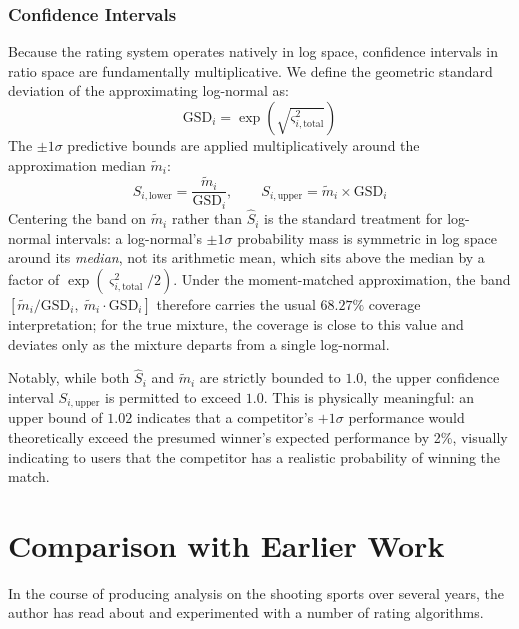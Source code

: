 \documentclass[12pt]{article}
\begin{document}
	\subsubsection*{Confidence Intervals}
	Because the rating system operates natively in log space, confidence intervals in ratio space are fundamentally multiplicative. We define the geometric standard deviation of the approximating log-normal as:
	\begin{equation}
		\mathrm{GSD}_i = \exp\!\left(\sqrt{\varsigma_{i,\mathrm{total}}^2}\right)
	\end{equation}
	The $\pm 1\sigma$ predictive bounds are applied multiplicatively around the approximation median $\tilde{m}_i$:
	\begin{equation}
		S_{i,\mathrm{lower}} = \frac{\tilde{m}_i}{\mathrm{GSD}_i}, \qquad S_{i,\mathrm{upper}} = \tilde{m}_i \times \mathrm{GSD}_i
	\end{equation}
	Centering the band on $\tilde{m}_i$ rather than $\hat{S}_i$ is the standard treatment for log-normal intervals: a log-normal's $\pm 1\sigma$ probability mass is symmetric in log space around its \emph{median}, not its arithmetic mean, which sits above the median by a factor of $\exp(\varsigma_{i,\mathrm{total}}^2/2)$. Under the moment-matched approximation, the band $[\tilde{m}_i/\mathrm{GSD}_i,\ \tilde{m}_i \cdot \mathrm{GSD}_i]$ therefore carries the usual $68.27\%$ coverage interpretation; for the true mixture, the coverage is close to this value and deviates only as the mixture departs from a single log-normal.

	Notably, while both $\hat{S}_i$ and $\tilde{m}_i$ are strictly bounded to $1.0$, the upper confidence interval $S_{i,\mathrm{upper}}$ is permitted to exceed $1.0$. This is physically meaningful: an upper bound of $1.02$ indicates that a competitor's $+1\sigma$ performance would theoretically exceed the presumed winner's expected performance by 2\%, visually indicating to users that the competitor has a realistic probability of winning the match.

	\section{Comparison with Earlier Work}
	In the course of producing analysis on the shooting sports over several years, the author has read about and experimented with a number of rating algorithms.
\end{document}
